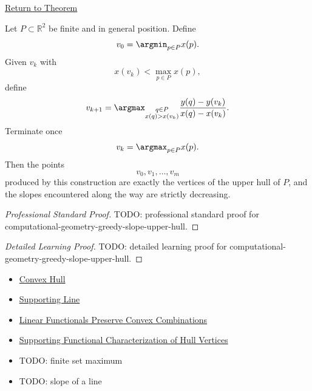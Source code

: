 \newpage
{}
\label{prf:computational-geometry-greedy-slope-upper-hull}

\begin{remark*}[Return]
\hyperref[thm:computational-geometry-greedy-slope-upper-hull]{Return to Theorem}

\end{remark*}

\begin{theorem*}
Let \(P\subset\mathbb{R}^2\) be finite and in general position. Define
\[
  v_0=\argmin_{p\in P}x(p).
\]
Given \(v_k\) with
\[
  x(v_k)<\max_{p\in P}x(p),
\]
define
\[
  v_{k+1}
  =
  \argmax_{\substack{q\in P\\x(q)>x(v_k)}}
  \frac{y(q)-y(v_k)}{x(q)-x(v_k)}.
\]
Terminate once
\[
  v_k=\argmax_{p\in P}x(p).
\]
Then the points
\[
  v_0,v_1,\dots,v_m
\]
produced by this construction are exactly the vertices of the upper hull of
\(P\), and the slopes encountered along the way are strictly decreasing.
\end{theorem*}

\begin{proof}[Professional Standard Proof]
\LRAProofBodyStart
TODO: professional standard proof for computational-geometry-greedy-slope-upper-hull.
\end{proof}

\begin{proof}[Detailed Learning Proof]
\LRAProofBodyStart
TODO: detailed learning proof for computational-geometry-greedy-slope-upper-hull.
\end{proof}

\begin{remark*}
\end{remark*}

\begin{dependencies}
\begin{itemize}
  \item \hyperref[def:computational-geometry-convex-hull]{Convex Hull}
  \item \hyperref[def:computational-geometry-supporting-line]{Supporting Line}
  \item \hyperref[lem:computational-geometry-linear-functionals-convex-combinations]{Linear Functionals Preserve Convex Combinations}
  \item \hyperref[thm:computational-geometry-supporting-functional-hull-vertices]{Supporting Functional Characterization of Hull Vertices}
  \item TODO: finite set maximum
  \item TODO: slope of a line
\end{itemize}
\end{dependencies}

\clearpage
